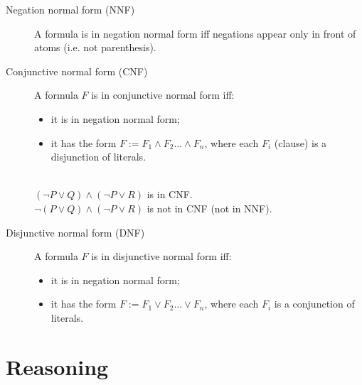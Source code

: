 \begin{description}
    \item[Negation normal form (NNF)] 
        A formula is in negation normal form iff negations appear only in front of atoms (i.e. not parenthesis).
        
    \item[Conjunctive normal form (CNF)] 
        A formula $F$ is in conjunctive normal form iff:
        \begin{itemize}
            \item it is in negation normal form;
            \item it has the form $F := F_1 \land F_2 \dots \land F_n$, where each $F_i$ (clause) is a disjunction of literals.
        \end{itemize}

        \begin{example} \phantom{}\\
            $(\lnot P \vee Q) \land (\lnot P \vee R)$ is in CNF.\\
            $\lnot(P \vee Q) \land (\lnot P \vee R)$ is not in CNF (not in NNF).
        \end{example}

    \item[Disjunctive normal form (DNF)] 
        A formula $F$ is in disjunctive normal form iff:
        \begin{itemize}
            \item it is in negation normal form;
            \item it has the form $F := F_1 \vee F_2 \dots \vee F_n$, where each $F_i$ is a conjunction of literals.
        \end{itemize}
\end{description}



\section{Reasoning}

